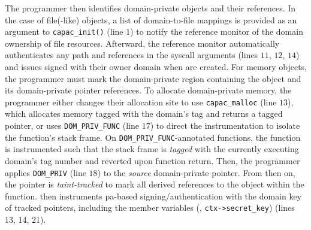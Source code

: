 The programmer then identifies domain-private objects and their references.
In the case of file(-like) objects, a list of domain-to-file mappings is provided as an argument to \texttt{capac\_init()} (line $1$) to notify the reference monitor of the domain ownership of file resources.
Afterward, the reference monitor automatically authenticates any path and \fd references in the \gls{syscall} arguments (lines $11$, $12$, $14$) and issues \fds signed with their owner domain when \fds are created.
For memory objects, the programmer must mark the domain-private region containing the object and its domain-private pointer references.
To allocate domain-private memory, the programmer either changes their allocation site to use \texttt{capac\_malloc} (line $13$), which allocates memory tagged with the domain's tag and returns a tagged pointer, or uses \texttt{DOM\_PRIV\_FUNC} (line $17$) to direct the instrumentation to isolate the function's stack frame.
On \texttt{DOM\_PRIV\_FUNC}-annotated functions, the function is instrumented such that the stack frame is \emph{tagged} with the currently executing domain's tag number and reverted upon function return.
Then, the programmer applies \texttt{DOM\_PRIV} (line $18$) to the \emph{source} domain-private pointer.
From then on, the pointer is \emph{taint-tracked} to mark all derived references to the object within the function.
\thename then instruments \gls{pa}-based signing/authentication with the domain key of tracked pointers, including the member variables (\eg, \texttt{ctx->secret\_key}) (lines 13, 14, 21).


